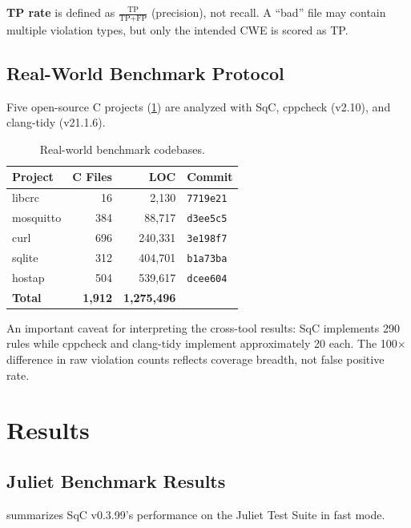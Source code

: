 \documentclass[10pt,twocolumn,letterpaper]{article}
\begin{document}
\textbf{TP rate} is defined as $\frac{\text{TP}}{\text{TP}+\text{FP}}$
(precision), not recall.  A ``bad'' file may contain multiple violation
types, but only the intended CWE is scored as TP.

\subsection{Real-World Benchmark Protocol}

Five open-source C projects (\cref{tab:realworld-codebases}) are
analyzed with SqC, cppcheck (v2.10), and clang-tidy (v21.1.6).

\begin{table}[t]
\centering
\footnotesize
\begin{tabular}{@{}lrrl@{}}
\toprule
\textbf{Project} & \textbf{C Files} & \textbf{LOC} & \textbf{Commit} \\
\midrule
libcrc & 16 & 2,130 & \texttt{7719e21} \\
mosquitto & 384 & 88,717 & \texttt{d3ee5c5} \\
curl & 696 & 240,331 & \texttt{3e198f7} \\
sqlite & 312 & 404,701 & \texttt{b1a73ba} \\
hostap & 504 & 539,617 & \texttt{dcee604} \\
\midrule
\textbf{Total} & \textbf{1,912} & \textbf{1,275,496} & \\
\bottomrule
\end{tabular}
\caption{Real-world benchmark codebases.}
\label{tab:realworld-codebases}
\end{table}

An important caveat for interpreting the cross-tool results: SqC
implements 290 rules while cppcheck and clang-tidy implement
approximately 20 each.  The 100$\times$ difference in raw violation
counts reflects coverage breadth, not false positive rate.

\section{Results}
\label{sec:results}

\subsection{Juliet Benchmark Results}

 summarizes SqC v0.3.99's performance on
the Juliet Test Suite in fast mode.
\end{document}
